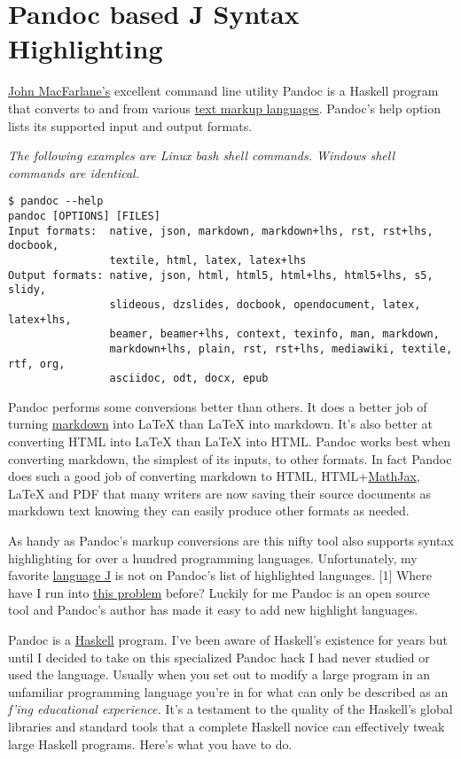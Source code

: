 \documentclass[]{article}
\author{}
\date{}
\begin{document}
\section{Pandoc based J Syntax Highlighting}

\href{http://johnmacfarlane.net/}{John MacFarlane's} excellent command
line utility Pandoc is a Haskell program that converts to and from
various \href{http://en.wikipedia.org/wiki/Markup\_language}{text markup
languages}. Pandoc's help option lists its supported input and output
formats.

\emph{The following examples are Linux bash shell commands. Windows
shell commands are identical.}

\begin{verbatim}
$ pandoc --help
pandoc [OPTIONS] [FILES]
Input formats:  native, json, markdown, markdown+lhs, rst, rst+lhs, docbook,
                textile, html, latex, latex+lhs
Output formats: native, json, html, html5, html+lhs, html5+lhs, s5, slidy,
                slideous, dzslides, docbook, opendocument, latex, latex+lhs,
                beamer, beamer+lhs, context, texinfo, man, markdown,
                markdown+lhs, plain, rst, rst+lhs, mediawiki, textile, rtf, org,
                asciidoc, odt, docx, epub
\end{verbatim}

Pandoc performs some conversions better than others. It does a better
job of turning
\href{http://daringfireball.net/projects/markdown/syntax}{markdown} into
LaTeX than LaTeX into markdown. It's also better at converting HTML into
LaTeX than LaTeX into HTML. Pandoc works best when converting markdown,
the simplest of its inputs, to other formats. In fact Pandoc does such a
good job of converting markdown to HTML,
HTML+\href{http://www.mathjax.org/}{MathJax}, LaTeX and PDF that many
writers are now saving their source documents as markdown text knowing
they can easily produce other formats as needed.

As handy as Pandoc's markup conversions are this nifty tool also
supports syntax highlighting for over a hundred programming languages.
Unfortunately, my favorite \href{http://www.jsoftware.com/}{language J}
is not on Pandoc's list of highlighted languages. {[}1{]} Where have I
run into
\href{http://bakerjd99.wordpress.com/2010/11/12/the-return-of-apl-fingers-2/}{this
problem} before? Luckily for me Pandoc is an open source tool and
Pandoc's author has made it easy to add new highlight languages.

Pandoc is a \href{http://www.haskell.org/haskellwiki/Haskell}{Haskell}
program. I've been aware of Haskell's existence for years but until I
decided to take on this specialized Pandoc hack I had never studied or
used the language. Usually when you set out to modify a large program in
an unfamiliar programming language you're in for what can only be
described as an \emph{f'ing educational experience.} It's a testament to
the quality of the Haskell's global libraries and standard tools that a
complete Haskell novice can effectively tweak large Haskell programs.
Here's what you have to do.
\end{document}
